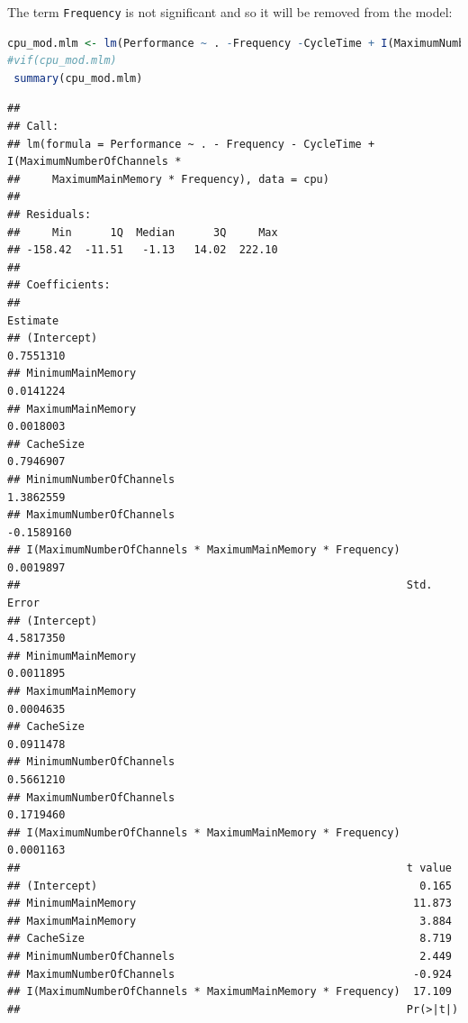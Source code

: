 \documentclass[
]{article}
\newcommand{\passthrough}[1]{#1}
\begin{document}
The term \passthrough{\lstinline!Frequency!} is not significant and so
it will be removed from the model:

\begin{lstlisting}[language=R]
cpu_mod.mlm <- lm(Performance ~ . -Frequency -CycleTime + I(MaximumNumberOfChannels * MaximumMainMemory * Frequency)  , data = cpu) 
#vif(cpu_mod.mlm)
 summary(cpu_mod.mlm)
\end{lstlisting}

\begin{lstlisting}
## 
## Call:
## lm(formula = Performance ~ . - Frequency - CycleTime + I(MaximumNumberOfChannels * 
##     MaximumMainMemory * Frequency), data = cpu)
## 
## Residuals:
##     Min      1Q  Median      3Q     Max 
## -158.42  -11.51   -1.13   14.02  222.10 
## 
## Coefficients:
##                                                              Estimate
## (Intercept)                                                 0.7551310
## MinimumMainMemory                                           0.0141224
## MaximumMainMemory                                           0.0018003
## CacheSize                                                   0.7946907
## MinimumNumberOfChannels                                     1.3862559
## MaximumNumberOfChannels                                    -0.1589160
## I(MaximumNumberOfChannels * MaximumMainMemory * Frequency)  0.0019897
##                                                            Std. Error
## (Intercept)                                                 4.5817350
## MinimumMainMemory                                           0.0011895
## MaximumMainMemory                                           0.0004635
## CacheSize                                                   0.0911478
## MinimumNumberOfChannels                                     0.5661210
## MaximumNumberOfChannels                                     0.1719460
## I(MaximumNumberOfChannels * MaximumMainMemory * Frequency)  0.0001163
##                                                            t value
## (Intercept)                                                  0.165
## MinimumMainMemory                                           11.873
## MaximumMainMemory                                            3.884
## CacheSize                                                    8.719
## MinimumNumberOfChannels                                      2.449
## MaximumNumberOfChannels                                     -0.924
## I(MaximumNumberOfChannels * MaximumMainMemory * Frequency)  17.109
##                                                            Pr(>|t|)    

\end{lstlisting}
\end{document}
